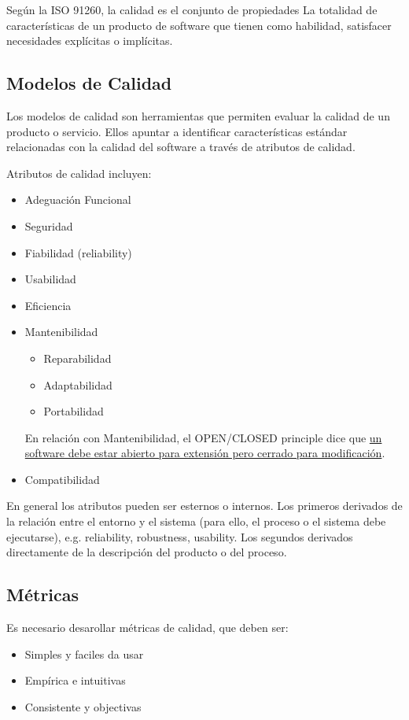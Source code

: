 \begin{definition}[Calidad - 3]
   Según la ISO 91260, la calidad es el conjunto de propiedades
La totalidad de características de un producto de software
que tienen como habilidad, satisfacer necesidades explícitas o
implícitas.
\end{definition}

\subsection{Modelos de Calidad}
Los modelos de calidad son herramientas que permiten evaluar la calidad de un producto o servicio. Ellos apuntar a identificar características estándar relacionadas con la
calidad del software a través de atributos de calidad.
{Atributos de calidad incluyen:\ns
\begin{itemize}
   \item Adeguación Funcional
   \item Seguridad
   \item Fiabilidad (reliability)
   \item Usabilidad
   \item Eficiencia
   \item Mantenibilidad
   \begin{itemize}
      \item Reparabilidad
      \item Adaptabilidad
      \item Portabilidad
   \end{itemize}
   En relación con Mantenibilidad, el OPEN/CLOSED principle dice que \ul{un software debe estar abierto para extensión pero cerrado para modificación}. 
   \item Compatibilidad
\end{itemize}
}

En general los atributos pueden ser esternos o internos. Los primeros derivados de la relación entre el entorno y el sistema (para ello, el proceso o el sistema debe ejecutarse), e.g. reliability, robustness, usability. Los segundos derivados directamente de la descripción del producto o del proceso.

\subsection{Métricas}
{Es necesario desarollar métricas de calidad, que deben ser:\ns
\begin{itemize}
   \item Simples y faciles da usar
   \item Empírica e intuitivas
   \item Consistente y objectivas
\end{itemize}}

